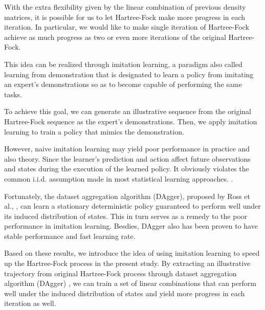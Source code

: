 \documentclass[twoside]{article}
\begin{document}
With the extra flexibility given by the linear combination of previous density matrices, it is possible for us to let Hartree-Fock make more progress in each iteration. 
In particular, we would like to make single iteration of Hartree-Fock achieve as much progress as two or even more iterations of the original Hartree-Fock.




This idea can be realized through imitation learning, a paradigm also called learning from demonstration that is designated to learn a policy from imitating an expert's demonstrations so as to become capable of performing the same tasks. 

To achieve this goal, we can generate an illustrative sequence from the original Hartree-Fock sequence as the expert's demonstrations. Then, we apply imitation learning to train a policy that mimics the demonstration. 



However, naive imitation learning may yield poor performance in practice and also theory.  Since the learner's prediction and action affect future observations and states during the execution of the learned policy. It obviously violates the common i.i.d. assumption made in most statistical learning approaches. \cite{Ross}.



Fortunately, the dataset aggregation algorithm (DAgger), proposed by Ross et al., \cite{DAgger}, can learn a stationary deterministic policy guaranteed to perform well under its induced distribution of states. This in turn serves as a remedy to the poor performance in imitation learning. Besdies, DAgger also has been proven to have stable performance and fast learning rate. \cite{DAggerCompare}

Based on these results, we introduce the idea of using imitation learning to speed up the Hartree-Fock process in the present study. By extracting an illustrative trajectory from original Hartree-Fock process
through dataset aggregation algorithm (DAgger) \cite{DAgger}, we can train a set of linear combinations that can perform well under the induced distribution of states and yield more progress in each iteration as well. 
\end{document}

